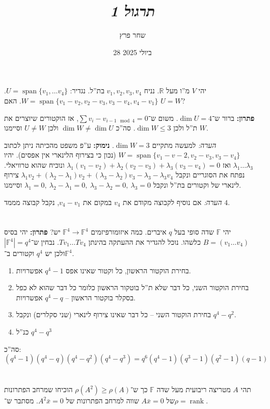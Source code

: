 \documentclass[]{article}
\author{שחר פרץ}
\title{\textit{תרגול 1}}
\date{28 ביולי  2025}
\newcommand\R     {\mathbb{R}}
\DeclareMathOperator{\Sp}     {span}
\DeclareMathOperator{\rk}     {rank}
\newcommand\F         {\mathbb{F}}
\renewcommand\lg      {\lambda}
\newcommand\sof[1]    {\left | #1 \right |}
\theoremstyle{definition}
\begin{document}
	\maketitle
	\section{}
	יהי $V$ מ''ו מעל $\R$. נניח $v_1, v_2, v_3, v_4$ בת''ל. נגדיר: $U = \Sp\{v_1, \dots v_4\}$. $W = \Sp \{v_1 - v_2, v_2 - v_3, v_3 - v_4, v_4 - v_1\}$. האם $U = W$? 
	
	\textbf{פתרון: }ברור ש־$\dim U = 4$. משום ש־$\sum v_{i} - v_{i - 1 \mod 4} = 0$, אז הוקטורים שיוצרים את $W$ ת''ל ולכן $\dim W\le 3$. סה''כ $\dim W \neq \dim U$ ולכן $U \neq W$ וסיימנו. 
	
	\textit{הערה: }למעשה מתקיים $\dim W = 3$. \textbf{נימוק: }ע''פ משפט מהכיתה ניתן לכתוב $W = \Sp\{v_1 - v-2, v_2 - v_3, v_3 - v_4\}$ (נכון כי בצירוף הלינארי אין אפסים). יהיו $\lg_1 \dots \lg_3$ ואז $\lg_1(v_1 - v_2) + \lg_2(v_2 - v_3) + \lg_3(v_3 - v_4) = 0$ ונוכיח שהוא טרוויאלי. נפתח את הסוגריים ונקבל $\lg_1 v_2 + (\lg_2 - \lg_1)v_2 + (\lg_3 - \lg_2)v_3 - \lg_3 - \lg_3v_4$ צירוף לינארי של וקטורים בת''ל ונקבל $\lg_1 = 0, \ \lg_2 - \lg_1 = 0, \ \lg_3 - \lg_2 = 0, \ \lg_3 = 0$ וסיימנו. 
	
	\textit{הערה: }אם נוסיף לקבוצה מקודם את $v_4$ במקום את $v_4 - v_1$, נקבל קבוצה מממד $4$. 
	
	\section{}
	יהי $\F$ שדה סופי בעל $q$ איברים. כמה איזומורפיזמים $\F^4 \to \F^4$ יש? 
	\textbf{פתרון: }יהי בסיס $B = (v_1 \dots v_4)$ כלשהו. נוכל להגדיר את ההעתקה בהינתן $Tv_1 \dots Tv_4$. נבחין ש־$\sof{\F^4} = q^4$ ולכן יש $q^4$ וקטורים ב־$\F^4$. 
	\begin{enumerate}
		\item בחירת הוקטור הראשון, כל וקטור שאינו אפס $q^4 - 1$ אפשרויות. 
		\item בחירת הוקטור השני, כל דבר שלא ת''ל בוטקור הראשון כלומר כל דבר שהוא לא כפל בסקלר בוקטור הראשון – $q^4 - q$ אפשרויות. 
		\item בחירת הוקטור השני – כל דבר שאינו צירוף לינארי (שני סקלרים) ונקבל $q^4 - q^2$. 
		\item כנ''ל $q^4 - q^3$
	\end{enumerate}
	סה''כ: 
	\[ (q^4 - 1)(q^4 - q)(q^4 - q^2)(q^4 - q^3) = q^6(q^4 - 1)(q^3 - 1)(q^2 - 1)(q - 1) \]
	
	\section{}
	תהי $A$ מטריצה ריבועית מעל שדה $\F$ כך ש־$\rho(A^2) \ge \rho(A)$ הוכיחו שמרחב הפתרונות של $A\bar x = 0$ שווה למרחב הפתרונות של $A^2\bar x = 0$. מסתבר ש־$\rho = \rk$. 
	
\end{document}
